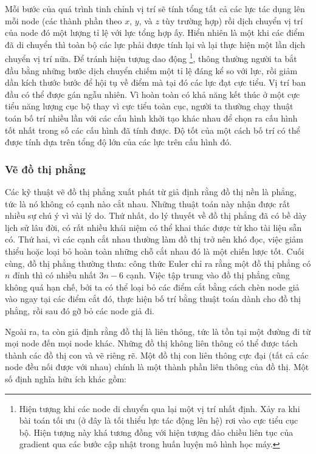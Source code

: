 \documentclass[12pt,a4paper, openany]{book}
\begin{document}
Mỗi bước của quá trình tinh chỉnh vị trí sẽ tính tổng tất cả các lực tác dụng lên mỗi node (các thành phần theo $x$, $y$, và $z$ tùy trường hợp) rồi dịch chuyển vị trí của node đó một lượng tỉ lệ với lực tổng hợp ấy. Hiển nhiên là một khi các điểm đã di chuyển thì toàn bộ các lực phải được tính lại và lại thực hiện một lần dịch chuyển vị trí nữa. Để tránh hiện tượng dao động \footnote{Hiện tượng khi các node di chuyển qua lại một vị trí nhất định. Xảy ra khi bài toán tối ưu (ở đây là tối thiểu lực tác động lên hệ) rơi vào cực tiểu cục bộ. Hiện tượng này khá tương đồng với hiện tượng đảo chiều liên tục của gradient qua các bước cập nhật trong huấn luyện mô hình học máy.}, thông thường người ta bắt đầu bằng những bước dịch chuyển chiếm một tỉ lệ đáng kể so với lực, rồi giảm dần kích thước bước để hội tụ về điểm mà tại đó các lực đạt cực tiểu. Vị trí ban đầu có thể được gán ngẫu nhiên. Vì hoàn toàn có khả năng kết thúc ở một cực tiểu năng lượng cục bộ thay vì cực tiểu toàn cục, người ta thường chạy thuật toán bố trí nhiều lần với các cấu hình khởi tạo khác nhau để chọn ra cấu hình tốt nhất trong số các cấu hình đã tính được. Độ tốt của một cách bố trí có thể được tính dựa trên tổng độ lớn của các lực trên cấu hình đó.

\subsubsection{Vẽ đồ thị phẳng}

Các kỹ thuật vẽ đồ thị phẳng xuất phát từ giả định rằng đồ thị nền là phẳng, tức là nó không có cạnh nào cắt nhau. Những thuật toán này nhận được rất nhiều sự chú ý vì vài lý do. Thứ nhất, do lý thuyết về đồ thị phẳng đã có bề dày lịch sử lâu đời, có rất nhiều khái niệm có thể khai thác được từ kho tài liệu sẵn có. Thứ hai, vì các cạnh cắt nhau thường làm đồ thị trở nên khó đọc, việc giảm thiểu hoặc loại bỏ hoàn toàn những chỗ cắt nhau đó là một chiến lược tốt. Cuối cùng, đồ thị phẳng thường thưa: công thức Euler chỉ ra rằng một đồ thị phẳng có $n$ đỉnh thì có nhiều nhất $3n − 6$ cạnh. Việc tập trung vào đồ thị phẳng cũng không quá hạn chế, bởi ta có thể loại bỏ các điểm cắt bằng cách chèn node giả vào ngay tại các điểm cắt đó, thực hiện bố trí bằng thuật toán dành cho đồ thị phẳng, rồi sau đó gỡ bỏ các node giả đi.

Ngoài ra, ta còn giả định rằng đồ thị là liên thông, tức là tồn tại một đường đi từ mọi node đến mọi node khác. Những đồ thị không liên thông có thể được tách thành các đồ thị con và vẽ riêng rẽ. Một đồ thị con liên thông cực đại (tất cả các node đều nối được với nhau) chính là một thành phần liên thông của đồ thị. Một số định nghĩa hữu ích khác gồm:
\end{document}
